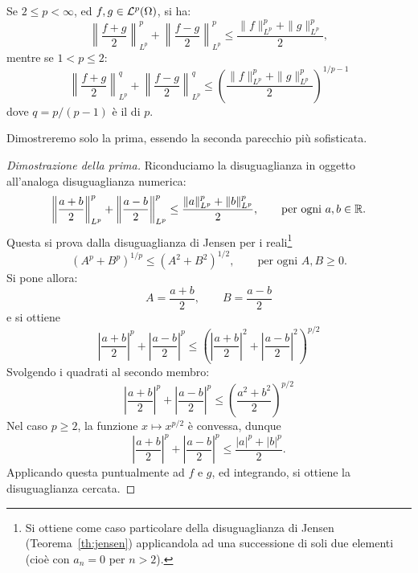 \begin{theorem}
	Se $2 \leq p < \infty$, ed $f,g \in \mathcal{L}^p(\Omega)$, si ha:
	\begin{equation*}
		\left\|\frac{f+g}2 \right\|_{L^p}^p + \left\|\frac{f - g}2 \right\|_{L^p}^p \leq \frac{\|f\|_{L^p}^p + \|g\|_{L^p}^p}2,
	\end{equation*}
	mentre se $1 < p \leq 2$:
	\begin{equation*}
		\left\|\frac{f+g}2 \right\|_{L^p}^q + \left\|\frac{f - g}2 \right\|_{L^p}^q \leq \left( \frac{\|f\|_{L^p}^p + \|g\|_{L^p}^p}2 \right)^{1/p-1}
	\end{equation*}
	dove $q = p/(p-1)$ è il  di $p$.
\end{theorem}
Dimostreremo solo la prima, essendo la seconda parecchio più sofisticata.
\begin{proof}[Dimostrazione della prima]
	Riconduciamo la disuguaglianza in oggetto all'analoga disuguaglianza numerica:
	\begin{equation*}
		\left\|\frac{a+b}2 \right\|_{L^p}^p + \left\|\frac{a - b}2 \right\|_{L^p}^p \leq \frac{\|a\|_{L^p}^p + \|b\|_{L^p}^p}2, \qquad \text{per ogni $a,b \in \mathbb{R}$}.
	\end{equation*}
	Questa si prova dalla disuguaglianza di Jensen per i reali\footnote{Si ottiene come caso particolare della disuguaglianza di Jensen (Teorema~\ref{th:jensen}) applicandola ad una successione di soli due elementi (cioè con $a_n = 0$ per $n>2$).}
	\begin{equation*}
		(A^p + B^p)^{1/p} \leq (A^2+B^2)^{1/2}, \qquad \text{per ogni $A,B \geq 0$}.
	\end{equation*}
	Si pone allora:
	\begin{equation*}
		A = \frac{a+b}2, \qquad B = \frac{a-b}2
	\end{equation*}
	e si ottiene
	\begin{equation*}
		\left| \frac{a+b}2 \right|^p + \left|\frac{a-b}2\right|^p \leq \left( \left| \frac{a+b}2 \right|^2 + \left|\frac{a-b}2\right|^2 \right)^{p/2}
	\end{equation*}
	Svolgendo i quadrati al secondo membro:
	\begin{equation*}
		\left| \frac{a+b}2 \right|^p + \left|\frac{a-b}2\right|^p \leq \left( \frac{a^2+b^2}2 \right)^{p/2}
	\end{equation*}
	Nel caso $p \geq 2$, la funzione $x \mapsto x^{p/2}$ è convessa, dunque
	\begin{equation*}
		\left| \frac{a+b}2 \right|^p + \left|\frac{a-b}2\right|^p \leq\frac{|a|^p + |b|^p}2.
	\end{equation*}
	Applicando questa puntualmente ad $f$ e $g$, ed integrando, si ottiene la disuguaglianza cercata.
\end{proof}

